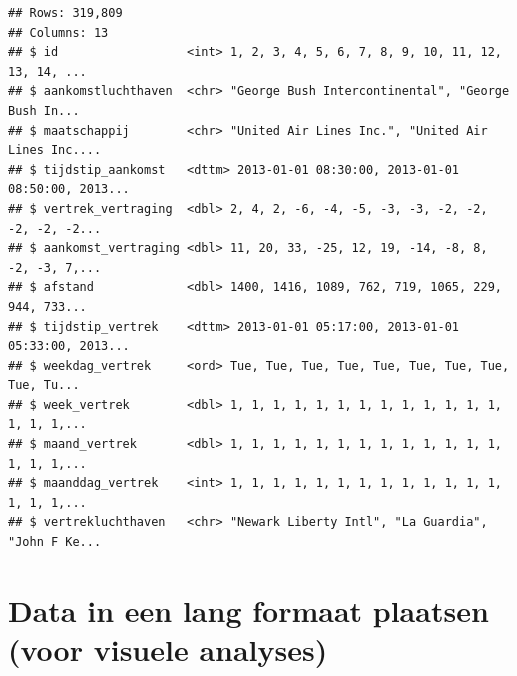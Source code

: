 \documentclass[]{tufte-book}
\newenvironment{Shaded}{}{}
\newcommand{\DataTypeTok}[1]{\textcolor[rgb]{0.56,0.13,0.00}{#1}}
\newcommand{\KeywordTok}[1]{\textcolor[rgb]{0.00,0.44,0.13}{\textbf{#1}}}
\newcommand{\NormalTok}[1]{#1}
\newcommand{\OperatorTok}[1]{\textcolor[rgb]{0.40,0.40,0.40}{#1}}
\newcommand{\StringTok}[1]{\textcolor[rgb]{0.25,0.44,0.63}{#1}}
\begin{document}
\begin{Shaded}
\end{Shaded}

\begin{verbatim}
## Rows: 319,809
## Columns: 13
## $ id                  <int> 1, 2, 3, 4, 5, 6, 7, 8, 9, 10, 11, 12, 13, 14, ...
## $ aankomstluchthaven  <chr> "George Bush Intercontinental", "George Bush In...
## $ maatschappij        <chr> "United Air Lines Inc.", "United Air Lines Inc....
## $ tijdstip_aankomst   <dttm> 2013-01-01 08:30:00, 2013-01-01 08:50:00, 2013...
## $ vertrek_vertraging  <dbl> 2, 4, 2, -6, -4, -5, -3, -3, -2, -2, -2, -2, -2...
## $ aankomst_vertraging <dbl> 11, 20, 33, -25, 12, 19, -14, -8, 8, -2, -3, 7,...
## $ afstand             <dbl> 1400, 1416, 1089, 762, 719, 1065, 229, 944, 733...
## $ tijdstip_vertrek    <dttm> 2013-01-01 05:17:00, 2013-01-01 05:33:00, 2013...
## $ weekdag_vertrek     <ord> Tue, Tue, Tue, Tue, Tue, Tue, Tue, Tue, Tue, Tu...
## $ week_vertrek        <dbl> 1, 1, 1, 1, 1, 1, 1, 1, 1, 1, 1, 1, 1, 1, 1, 1,...
## $ maand_vertrek       <dbl> 1, 1, 1, 1, 1, 1, 1, 1, 1, 1, 1, 1, 1, 1, 1, 1,...
## $ maanddag_vertrek    <int> 1, 1, 1, 1, 1, 1, 1, 1, 1, 1, 1, 1, 1, 1, 1, 1,...
## $ vertrekluchthaven   <chr> "Newark Liberty Intl", "La Guardia", "John F Ke...
\end{verbatim}

\hypertarget{data-in-een-lang-formaat-plaatsen-voor-visuele-analyses}{%
\section{Data in een lang formaat plaatsen (voor visuele analyses)}\label{data-in-een-lang-formaat-plaatsen-voor-visuele-analyses}}
\end{document}
